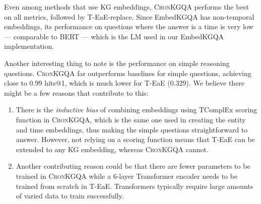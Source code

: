 \documentclass[11pt,a4paper]{article}
\newcommand{\method}{\textsc{CronKGQA}}
\begin{document}
Even among methods that use KG embeddings, \method{} performs the best on all metrics, followed by T-EaE-replace. Since EmbedKGQA has non-temporal embeddings, its performance on questions where the answer is a time is very low --- comparable to BERT --- which is the LM used in our EmbedKGQA implementation.



Another interesting thing to note is the performance on simple reasoning questions. \method{} far outperforms baselines for simple questions, achieving close to 0.99 hits@1, which is much lower for T-EaE (0.329). We believe there might be a few reasons that contribute to this:
\begin{enumerate}
    \item There is the \textit{inductive bias} of combining embeddings using TComplEx scoring function in \method{}, which is the same one used in creating the entity and time embeddings, thus making the simple questions straightforward to answer. However, not relying on a scoring function means that T-EaE can be extended to any KG embedding, whereas \method{} cannot. 
    \item Another contributing reason could be that there are fewer parameters to be trained in \method{} while a 6-layer Transformer encoder needs to be trained from scratch in T-EaE. Transformers typically require large amounts of varied data to train successfully.
\end{enumerate}
\end{document}
